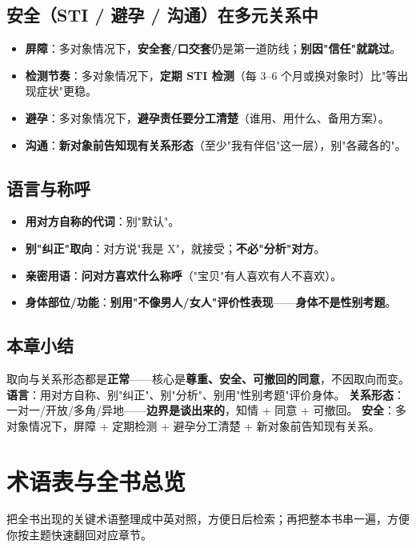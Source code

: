 \documentclass[12pt,UTF8,openany]{ctexbook}
\begin{document}
\section{安全（STI / 避孕 / 沟通）在多元关系中}
\begin{itemize}[leftmargin=2em,itemsep=0.3em]
  \item \textbf{屏障}：多对象情况下，\textbf{安全套/口交套}仍是第一道防线；\textbf{别因"信任"就跳过}。
  \item \textbf{检测节奏}：多对象情况下，\textbf{定期 STI 检测}（每 3--6 个月或换对象时）比"等出现症状"更稳。
  \item \textbf{避孕}：多对象情况下，\textbf{避孕责任要分工清楚}（谁用、用什么、备用方案）。
  \item \textbf{沟通}：\textbf{新对象前告知现有关系形态}（至少"我有伴侣"这一层），别"各藏各的"。
\end{itemize}

\section{语言与称呼}
\begin{itemize}[leftmargin=2em,itemsep=0.3em]
  \item \textbf{用对方自称的代词}：别"默认"。
  \item \textbf{别"纠正"取向}：对方说"我是 X"，就接受；\textbf{不必"分析"对方}。
  \item \textbf{亲密用语}：\textbf{问对方喜欢什么称呼}（"宝贝"有人喜欢有人不喜欢）。
  \item \textbf{身体部位/功能}：\textbf{别用"不像男人/女人"评价性表现}——\textbf{身体不是性别考题}。
\end{itemize}

\section{本章小结}
取向与关系形态都是\textbf{正常}——核心是\textbf{尊重、安全、可撤回的同意}，不因取向而变。
\textbf{语言}：用对方自称、别"纠正"、别"分析"、别用"性别考题"评价身体。
\textbf{关系形态}：一对一/开放/多角/异地——\textbf{边界是谈出来的}，知情 + 同意 + 可撤回。
\textbf{安全}：多对象情况下，屏障 + 定期检测 + 避孕分工清楚 + 新对象前告知现有关系。


\chapter{术语表与全书总览}
\label{chap:glossary}

把全书出现的关键术语整理成中英对照，方便日后检索；再把整本书串一遍，方便你按主题快速翻回对应章节。
\end{document}
